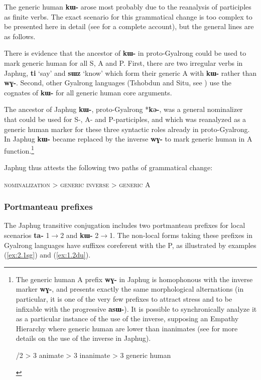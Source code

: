 \documentclass[oldfontcommands,oneside,a4paper,11pt]{article}
\newcommand{\ipa}[1]{\mbox{\phon\textbf{#1}}} %
\begin{document}
The generic human \ipa{kɯ-} arose most probably due to the reanalysis of participles as finite verbs. The exact scenario for this grammatical change is too complex to be presented here in detail (see \citealt{jacques15generic} for a complete account), but the general lines are as follows.

There is evidence that the ancestor of \ipa{kɯ-} in proto-Gyalrong could be used to mark generic human for all S, A and P. First, there are two irregular verbs in Japhug, \ipa{ti} `say' and \ipa{sɯz} `know' which form their generic A with \ipa{kɯ-} rather than \ipa{wɣ-}. Second, other Gyalrong  languages (Tshobdun and Situ, see \citealt{sun14generic}) use the cognates of \ipa{kɯ-} for all generic human core arguments.
 
The ancestor of Japhug \ipa{kɯ-}, proto-Gyalrong *\ipa{kə-}, was a general nominalizer that could be used for S-, A- and P-participles, and which was reanalyzed as a generic human marker for these three syntactic roles already in proto-Gyalrong. In Japhug \ipa{kɯ-} became replaced by the inverse \ipa{wɣ-} to mark generic human in A function.\footnote{The generic human A prefix  \ipa{wɣ-} in Japhug is homophonous with the inverse marker \ipa{wɣ-}, and presents exactly the same morphological alternations (in particular, it is one of the very few prefixes to attract stress and to be infixable with the progressive \ipa{asɯ-}). It is possible to synchronically analyze it  as a particular instance of the use of the inverse, supposing an Empathy Hierarchy where generic human are lower than inanimates (see \citealt{jacques10inverse, jacques12demotion} for more details on the use of the inverse in Japhug). 

\begin{exe}
\ex 
{}/2 > 3 animate > 3 inanimate > 3 generic human
\end{exe}
}

Japhug thus attests the following two paths of grammatical change:

\begin{exe}
\ex 
\glt \textsc{nominalization} > \textsc{generic} 
\ex 
\glt \textsc{inverse} > \textsc{generic A}
\end{exe}

\subsubsection{Portmanteau prefixes}
The Japhug transitive conjugation includes two portmanteau prefixes for local scenarios \ipa{ta-} 1$\rightarrow$2 and \ipa{kɯ-} 2$\rightarrow$1.  The non-local forms taking these prefixes in Gyalrong languages have suffixes coreferent with the P, as illustrated by examples (\ref{ex:2.1sg}) and (\ref{ex:1.2du}).
\end{document}
